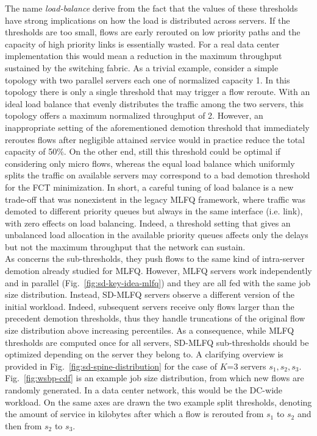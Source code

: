 \smallskip
The name \emph{load-balance} derive from the fact that the values of these thresholds have strong implications on how the load is distributed across servers. If the thresholds are too small, flows are early rerouted on low priority paths and the capacity of high priority links is essentially wasted. For a real data center implementation this would mean a reduction in the maximum throughput sustained by the switching fabric. As a trivial example, consider a simple topology with two parallel servers each one of normalized capacity 1. In this topology there is only a single threshold that may trigger a flow reroute. With an ideal load balance that evenly distributes the traffic among the two servers, this topology offers a maximum normalized throughput of 2. However, an inappropriate setting of the aforementioned demotion threshold that immediately reroutes flows after negligible attained service would in practice reduce the total capacity  of 50\%. On the other end, still this threshold could be optimal if considering only micro flows, whereas the equal load balance which uniformly splits the traffic on available servers may correspond to a bad demotion threshold for the FCT minimization. In short, a careful tuning of load balance is a new trade-off that was nonexistent in the legacy MLFQ framework, where traffic was demoted to different priority queues but always in the same interface (i.e. link), with zero effects on load balancing. Indeed, a threshold setting that gives an unbalanced load allocation in the available priority queues affects only the delays but not the maximum throughput that the network can sustain. \\
As concerns the sub-thresholds, they push flows to the same kind of intra-server demotion already studied for MLFQ. However, MLFQ servers work independently and in parallel (Fig.~\ref{fig:sd-key-idea-mlfq}) and they are all fed with the same job size distribution. Instead, SD-MLFQ servers observe a different version of the initial workload. Indeed, subsequent servers receive only flows larger than the precedent demotion thresholds, thus they handle truncations of the original flow size distribution above increasing percentiles. As a consequence, while MLFQ thresholds are computed once for all servers, SD-MLFQ sub-thresholds should be optimized depending on the server they belong to. A clarifying overview is provided in Fig.~\ref{fig:sd-spine-distribution} for the case of $K$=3 servers $s_1,s_2,s_3$. Fig.~\ref{fig:wsbp-cdf} is an example job size distribution, from which new flows are randomly generated. In a data center network, this would be the DC-wide workload. On the same axes are drawn the two example split thresholds, denoting the amount of service in kilobytes after which a flow is rerouted from $s_1$ to $s_2$ and then from $s_2$ to $s_3$. 
